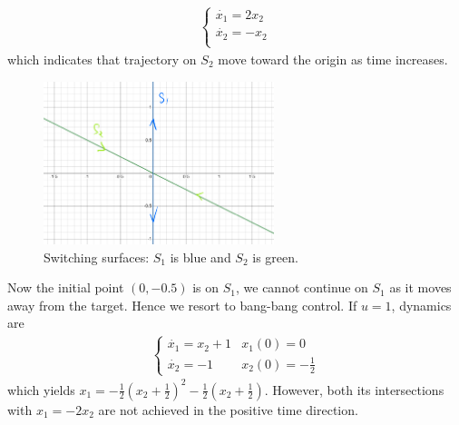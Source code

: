 \documentclass[12pt]{article}
\begin{document}
\begin{problem}[2]
\begin{enumerate}[label=(\alph*)]
\begin{align*}
	\begin{cases}
		\dot{x_1} = 2x_2 \\
		\dot{x_2} = -x_2 \\
	\end{cases}
\end{align*}
which indicates that trajectory on $ S_2$ move toward the origin as time increases.
~\begin{figure}[H]
	\centering
	\includegraphics[width=0.6\textwidth]{./figures/6.16.png}
	\caption{Switching surfaces: $ S_1$ is blue and $ S_2$ is green.}
\end{figure}
Now the initial point $ (0,-0.5)$ is on $ S_1$, we cannot continue on $ S_1$ as it moves away from the target. Hence we resort to bang-bang control. If $ u=1$, dynamics are
\begin{align*}
	\begin{cases}
		\dot{x_1} = x_2 + 1 & x_1(0) = 0\\
		\dot{x_2} = -1 & x_2(0) = -\frac{1}{2}
	\end{cases}
\end{align*}
which yields $ x_1 = -\frac{1}{2} \left( x_2+\frac{1}{2} \right)^2 - \frac{1}{2}\left(x_2+\frac{1}{2}\right) $. However, both its intersections with $ x_1 = -2 x_2$ are not achieved in the positive time direction.


\end{enumerate}
\end{problem}
\end{document}

